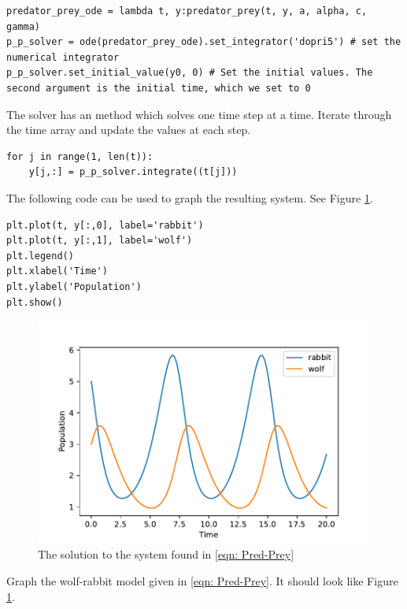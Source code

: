 \begin{lstlisting}
predator_prey_ode = lambda t, y:predator_prey(t, y, a, alpha, c, gamma)
p_p_solver = ode(predator_prey_ode).set_integrator('dopri5') # set the numerical integrator
p_p_solver.set_initial_value(y0, 0) # Set the initial values. The second argument is the initial time, which we set to 0
\end{lstlisting}

The  solver has an  method which solves one time step at a time.
Iterate through the time array and update the  values at each step.
\begin{lstlisting}
for j in range(1, len(t)):
	y[j,:] = p_p_solver.integrate((t[j]))
\end{lstlisting}

The following code can be used to graph the resulting system. See Figure \ref{fig: Pred-Prey}.

\begin{lstlisting}
plt.plot(t, y[:,0], label='rabbit')
plt.plot(t, y[:,1], label='wolf')
plt.legend()
plt.xlabel('Time')
plt.ylabel('Population')
plt.show()
\end{lstlisting}

\begin{figure}
\centering
\includegraphics[width=\textwidth]{Predator_Prey.pdf}
\caption{The solution to the system found in \eqref{eqn: Pred-Prey}}
\label{fig: Pred-Prey}
\end{figure}

\begin{problem}
Graph the wolf-rabbit model given in \eqref{eqn: Pred-Prey}.
It should look like Figure \ref{fig: Pred-Prey}.
\end{problem}

